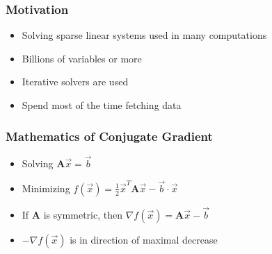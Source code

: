 \documentclass{beamer}
\title{}
\subtitle{All-College Thesis Defense}
\author{\textbf{Neil Lindquist}}
\date{April 16th, 2019}
\newcommand{\mat}[1]{\mathbf{#1}}
\begin{document}
\begin{frame}
	\titlepage
\end{frame}

\begin{frame}
	\frametitle{Motivation}
	\begin{itemize}
		\item Solving sparse linear systems used in many computations
		\item Billions of variables or more
		\item Iterative solvers are used
		\item Spend most of the time fetching data
	\end{itemize}
\end{frame}

\begin{frame}
	\frametitle{Mathematics of Conjugate Gradient}
	\begin{itemize}
		\item Solving \(\mat{A}\vec{x} = \vec{b}\)
		\pause
		\item Minimizing \(f(\vec{x}) = \tfrac{1}{2}\vec{x}^T\mat{A}\vec{x}-\vec{b}\cdot\vec{x}\)
		\pause
		\item If \(\mat{A}\) is symmetric, then \(\nabla f(\vec{x}) = \mat{A}\vec{x} - \vec{b}\)
		\pause
		\item \(-\nabla f(\vec{x})\) is in direction of maximal decrease
	\end{itemize}
\end{frame}
\end{document}
